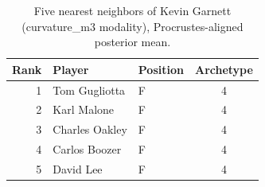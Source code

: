 \begin{table}[htbp]
  \centering\small
  \begin{tabular}{rllc}
    \toprule
    Rank & Player & Position & Archetype \\
    \midrule
    1 & Tom Gugliotta & F & 4 \\
    2 & Karl Malone & F & 4 \\
    3 & Charles Oakley & F & 4 \\
    4 & Carlos Boozer & F & 4 \\
    5 & David Lee & F & 4 \\
    \bottomrule
  \end{tabular}
  \caption{Five nearest neighbors of Kevin Garnett (curvature_m3 modality), Procrustes-aligned posterior mean.}
  \label{tab:Kevin_Garnett_neighbors_curvature_m3}
\end{table}

